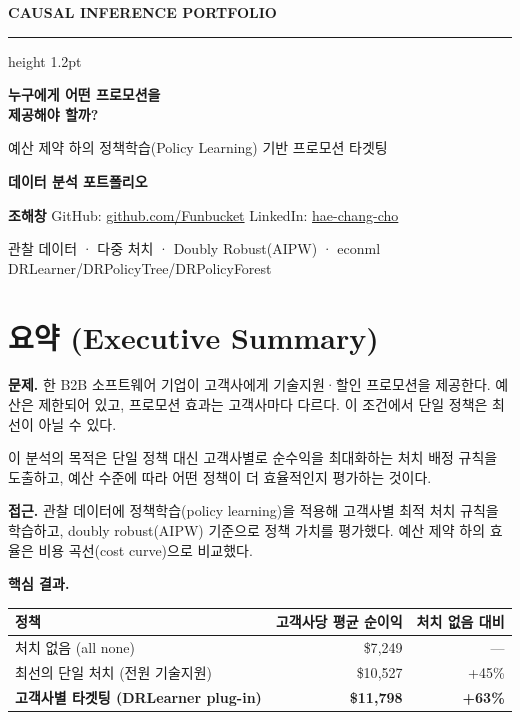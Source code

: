 \documentclass[11pt]{article}
\newcommand{\kpi}[1]{{\color{brand}\bfseries #1}}
\begin{document}
\thispagestyle{empty}
\vspace*{1.2cm}
{\sffamily\bfseries\color{brand}\large CAUSAL INFERENCE PORTFOLIO}
\vskip 2pt
{\color{rulegray}\hrule height 1.2pt}

\vspace{4.5cm}
{\sffamily\bfseries\fontsize{30}{36}\selectfont 누구에게 어떤 프로모션을\\[4pt] 제공해야 할까?\par}
\vspace{0.8cm}
{\sffamily\Large\color{ink} 예산 제약 하의 정책학습(Policy Learning) 기반 프로모션 타겟팅\par}

\vspace{3.2cm}
{\sffamily\large\bfseries\color{brand} 데이터 분석 포트폴리오\par}

\vfill
{\footnotesize\color{ink}
\textbf{조해창} \quad
GitHub: \href{https://github.com/Funbucket}{github.com/Funbucket} \quad
LinkedIn: \href{https://www.linkedin.com/in/hae-chang-cho/}{hae-chang-cho}\par
\vskip 4pt
관찰 데이터 · 다중 처치 · Doubly Robust(AIPW) · econml DRLearner/DRPolicyTree/DRPolicyForest
}
\newpage

\section*{\sffamily\color{brand} 요약 (Executive Summary)}

\textbf{문제.} 한 B2B 소프트웨어 기업이 고객사에게 기술지원·할인 프로모션을 제공한다. 예산은 제한되어 있고, 프로모션 효과는 고객사마다 다르다. 이 조건에서 단일 정책은 최선이 아닐 수 있다.

이 분석의 목적은 단일 정책 대신 고객사별로 순수익을 최대화하는 처치 배정 규칙을 도출하고, 예산 수준에 따라 어떤 정책이 더 효율적인지 평가하는 것이다.

\textbf{접근.} 관찰 데이터에 정책학습(policy learning)을 적용해 고객사별 최적 처치 규칙을 학습하고, doubly robust(AIPW) 기준으로 정책 가치를 평가했다. 예산 제약 하의 효율은 비용 곡선(cost curve)으로 비교했다.

\textbf{핵심 결과.}

\begin{table}[h]
\centering
\small
\begin{tabular}{lrr}
\toprule
정책 & 고객사당 평균 순이익 & 처치 없음 대비 \\
\midrule
처치 없음 (all none) & \$7{,}249 & --- \\
최선의 단일 처치 (전원 기술지원) & \$10{,}527 & +45\% \\
\textbf{고객사별 타겟팅 (DRLearner plug-in)} & \kpi{\$11{,}798} & \kpi{+63\%} \\
\bottomrule
\end{tabular}
\end{table}
\end{document}
